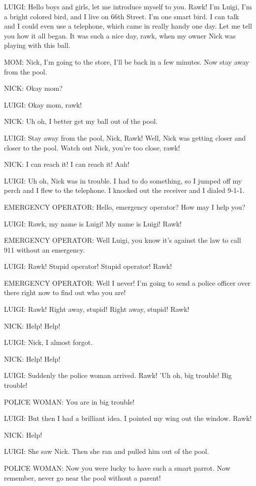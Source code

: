 LUIGI:
Hello boys and girls, let me introduce myself to you.
Rawk!
I'm Luigi, I'm a bright colored bird, and I live on 66th Street.
I'm one smart bird.
I can talk and I could even use a telephone, which came in really handy one day.
Let me tell you how it all began.
It was such a nice day, rawk, when my owner Nick was playing with this ball.

MOM:
Nick, I'm going to the store, I'll be back in a few minutes.
Now stay away from the pool.

NICK:
Okay mom?

LUIGI:
Okay mom, rawk!

NICK:
Uh oh, I better get my ball out of the pool.

LUIGI:
Stay away from the pool, Nick, Rawk!
Well, Nick was getting closer and closer to the pool.
Watch out Nick, you're too close, rawk!

NICK:
I can reach it!
I can reach it!
Aah!

LUIGI:
Uh oh, Nick was in trouble.
I had to do something, so I jumped off my perch and I flew to the telephone.
I knocked out the receiver and I dialed 9-1-1.

EMERGENCY OPERATOR:
Hello, emergency operator?
How may I help you?

LUIGI:
Rawk, my name is Luigi!
My name is Luigi! Rawk!

EMERGENCY OPERATOR:
Well Luigi, you know it's against the law to call 911 without an emergency.

LUIGI:
Rawk!
Stupid operator!
Stupid operator!
Rawk!

EMERGENCY OPERATOR:
Well I never!
I'm going to send a police officer over there right now to find out who you are!

LUIGI:
Rawk! Right away, stupid!
Right away, stupid!
Rawk!

NICK:
Help! Help!

LUIGI:
Nick, I almost forgot.

NICK:
Help! Help!

LUIGI:
Suddenly the police woman arrived. Rawk!
'Uh oh, big trouble!
Big trouble!

POLICE WOMAN:
You are in big trouble!

LUIGI:
But then I had a brilliant idea.
I pointed my wing out the window. Rawk!

NICK:
Help!

LUIGI:
She saw Nick.
Then she ran and pulled him out of the pool.

POLICE WOMAN:
Now you were lucky to have such a smart parrot.
Now remember, never go near the pool without a parent!

